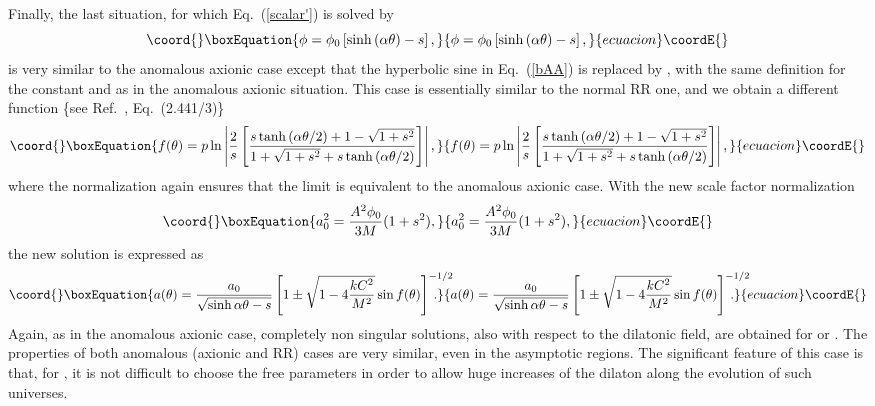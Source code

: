 \documentclass[a4paper,aps,twocolumn,prd,showpacs,nofootinbib]{revtex4}
\begin{document}
Finally, the last situation, for which Eq.~(\ref{scalar'}) is solved
by
\begin{equation}\coord{}\boxEquation{
\phi =\phi_0 \left[\sinh\left(\alpha\theta\right)-s\right],
}{
\phi =\phi_0 \left[\sinh\left(\alpha\theta\right)-s\right],
}{ecuacion}\coordE{}\end{equation}
is very similar to the anomalous axionic case except that the
hyperbolic sine in Eq.~(\ref{bAA}) is replaced by \coordHE{}, with the same definition for the constant \coordHE{} and
\coordHE{} as in the anomalous axionic situation. This case is essentially
similar to the normal RR one, and we obtain a different function \{see
Ref.~\cite{Grad}, Eq.~(2.441/3)\}
\begin{equation}\coord{}\boxEquation{
f(\theta) = p\ln\left| {2\over s}
\left[\frac{s\tanh\left(\alpha\theta/2\right) + 1 - \sqrt{1 + s^2}}{1
+ \sqrt{1 + s^2}+ s\tanh\left(\alpha\theta/2\right)}\right]\right|,
}{
f(\theta) = p\ln\left| {2\over s}
\left[\frac{s\tanh\left(\alpha\theta/2\right) + 1 - \sqrt{1 + s^2}}{1
+ \sqrt{1 + s^2}+ s\tanh\left(\alpha\theta/2\right)}\right]\right|,
}{ecuacion}\coordE{}\end{equation}
where the normalization again ensures that the limit \coordHE{} is
equivalent to the anomalous axionic case. With the new scale factor
normalization
\begin{equation}\coord{}\boxEquation{
a_0^2 = {A^2 \phi_0\over 3M}(1+s^2),
}{
a_0^2 = {A^2 \phi_0\over 3M}(1+s^2),
}{ecuacion}\coordE{}\end{equation}
the new solution is expressed as
\begin{equation}\coord{}\boxEquation{
a(\theta) = \frac{a_0}{\sqrt{\sinh\alpha\theta - s}}\left[1 \pm
\sqrt{1 - 4\displaystyle{\frac{kC^2}{M^2}}}\sin
f(\theta)\right]^{-1/2} \!\!\!\!\!\!\!\!\!\!.
}{
a(\theta) = \frac{a_0}{\sqrt{\sinh\alpha\theta - s}}\left[1 \pm
\sqrt{1 - 4\displaystyle{\frac{kC^2}{M^2}}}\sin
f(\theta)\right]^{-1/2} \!\!\!\!\!\!\!\!\!\!.
}{ecuacion}\coordE{}\end{equation}
Again, as in the anomalous axionic case, completely non singular
solutions, also with respect to the dilatonic field, are obtained for
\coordHE{} or \coordHE{}. The properties of both anomalous (axionic and RR)
cases are very similar, even in the asymptotic regions.  The
significant feature of this case is that, for \coordHE{}, it is not
difficult to choose the free parameters in order to allow huge
increases of the dilaton along the evolution of such universes.
\end{document}
